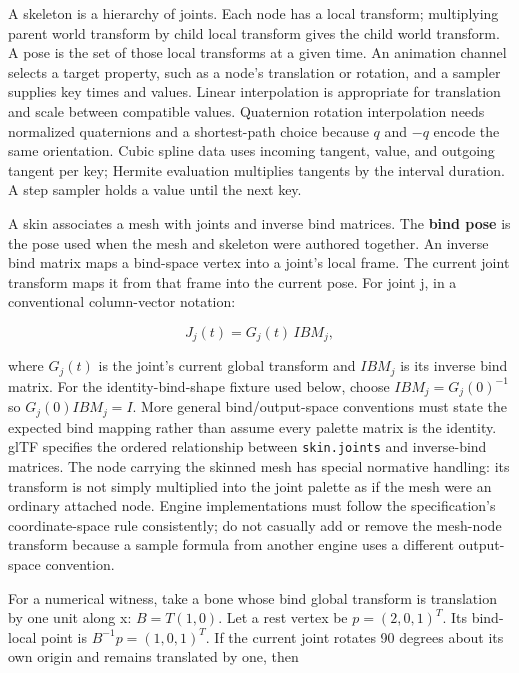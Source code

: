 \hypertarget{04-visual-computing-ii-ch037-build-a-pose-first-then-deform-the-surface}{}

A skeleton is a hierarchy of joints. Each node has a local transform; multiplying parent world transform by child local transform gives the child world transform. A pose is the set of those local transforms at a given time. An animation channel selects a target property, such as a node's translation or rotation, and a sampler supplies key times and values. Linear interpolation is appropriate for translation and scale between compatible values. Quaternion rotation interpolation needs normalized quaternions and a shortest-path choice because \(q\) and \(-q\) encode the same orientation. Cubic spline data uses incoming tangent, value, and outgoing tangent per key; Hermite evaluation multiplies tangents by the interval duration. A step sampler holds a value until the next key.

A skin associates a mesh with joints and inverse bind matrices. The \textbf{bind pose} is the pose used when the mesh and skeleton were authored together. An inverse bind matrix maps a bind-space vertex into a joint's local frame. The current joint transform maps it from that frame into the current pose. For joint j, in a conventional column-vector notation:

\[
J_j(t)=G_j(t)\,IBM_j,
\]

where \(G_j(t)\) is the joint's current global transform and \(IBM_j\) is its inverse bind matrix. For the identity-bind-shape fixture used below, choose \(IBM_j=G_j(0)^{-1}\) so \(G_j(0)IBM_j=I\). More general bind/output-space conventions must state the expected bind mapping rather than assume every palette matrix is the identity. glTF specifies the ordered relationship between \texttt{skin.joints} and inverse-bind matrices. The node carrying the skinned mesh has special normative handling: its transform is not simply multiplied into the joint palette as if the mesh were an ordinary attached node. Engine implementations must follow the specification's coordinate-space rule consistently; do not casually add or remove the mesh-node transform because a sample formula from another engine uses a different output-space convention.

For a numerical witness, take a bone whose bind global transform is translation by one unit along x: \(B=T(1,0)\). Let a rest vertex be \(p=(2,0,1)^T\). Its bind-local point is \(B^{-1}p=(1,0,1)^T\). If the current joint rotates 90 degrees about its own origin and remains translated by one, then

